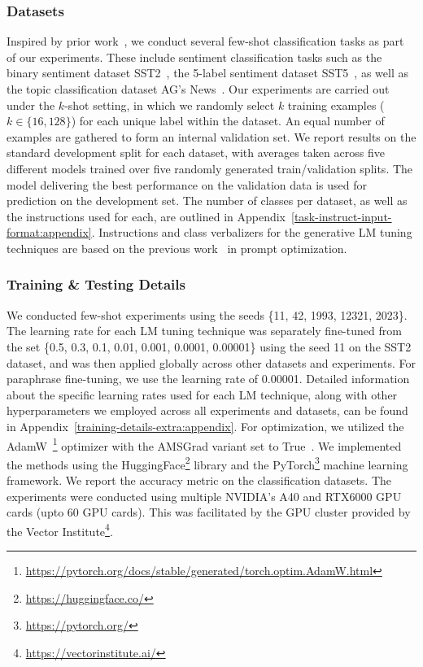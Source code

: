 \documentclass[11pt]{article}
\begin{document}
\subsubsection{Datasets}
Inspired by prior work~\cite{gao-etal-2021-making, deng-etal-2022-rlprompt}, we conduct several few-shot classification tasks as part of our experiments. These include sentiment classification tasks such as the binary sentiment dataset SST2~\cite{socher-etal-2013-recursive}, the 5-label sentiment dataset SST5~\cite{socher-etal-2013-recursive}, as well as the topic classification dataset AG's News~\cite{NIPS2015_250cf8b5}. Our experiments are carried out under the $k$-shot setting, in which we randomly select $k$ training examples ($k \in \{16, 128\}$) for each unique label within the dataset. An equal number of examples are gathered to form an internal validation set. We report results on the standard development split for each dataset, with averages taken across five different models trained over five randomly generated train/validation splits. The model delivering the best performance on the validation data is used for prediction on the development set. The number of classes per dataset, as well as the instructions used for each, are outlined in Appendix~\ref{task-instruct-input-format:appendix}. Instructions and class verbalizers for the generative LM tuning techniques are based on the previous work~\cite{deng-etal-2022-rlprompt} in prompt optimization.
\subsubsection{Training \& Testing Details}
We conducted few-shot experiments using the seeds \{11, 42, 1993, 12321, 2023\}. The learning rate for each LM tuning technique was separately fine-tuned from the set \{0.5, 0.3, 0.1, 0.01, 0.001, 0.0001, 0.00001\} using the seed 11 on the SST2 dataset, and was then applied globally across other datasets and experiments. For paraphrase fine-tuning, we use the learning rate of 0.00001. Detailed information about the specific learning rates used for each LM technique, along with other hyperparameters we employed across all experiments and datasets, can be found in Appendix~\ref{training-details-extra:appendix}. For optimization, we utilized the AdamW~\cite{DBLP:journals/corr/abs-1711-05101}\footnote{\url{https://pytorch.org/docs/stable/generated/torch.optim.AdamW.html}} optimizer with the AMSGrad variant set to True~\cite{DBLP:journals/corr/abs-1904-09237}. We implemented the methods using the HuggingFace\footnote{\url{https://huggingface.co/}} library and the PyTorch\footnote{\url{https://pytorch.org/}} machine learning framework. We report the accuracy metric on the classification datasets. The experiments were conducted using multiple NVIDIA's A40 and RTX6000 GPU cards (upto 60 GPU cards). This was facilitated by the GPU cluster provided by the Vector Institute\footnote{\url{https://vectorinstitute.ai/}}.
\end{document}
